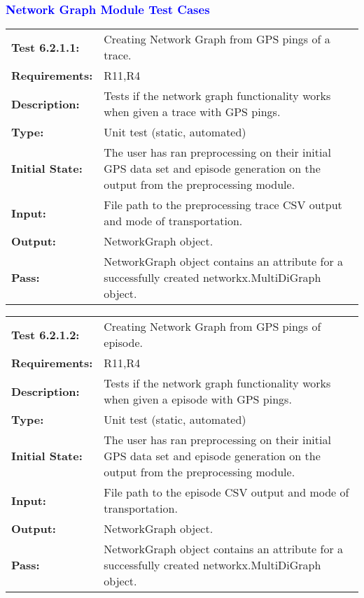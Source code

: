 \documentclass[12pt, titlepage]{article}
\begin{document}
\textcolor{blue}{
\subsubsection{Network Graph Module Test Cases}
\begin{tabular}{|l|p{10cm}|}
    \hline
    \bf{Test} 6.2.1.1: & Creating Network Graph from GPS pings of a trace. \\
    \bf{Requirements}: & R11,R4 \\
    \bf{Description}: & Tests if the network graph functionality works when given a trace with GPS pings. \\
    \bf{Type}: & Unit test (static, automated) \\
    \bf{Initial State}: & The user has ran preprocessing on their initial GPS data set and episode generation on the output from the preprocessing module. \\
    \bf{Input}: & File path to the preprocessing trace CSV output and mode of transportation. \\
    \bf{Output}: & NetworkGraph object. \\
    \bf{Pass}: & NetworkGraph object contains an attribute for a successfully created networkx.MultiDiGraph object. \\
    \hline
\end{tabular}
\begin{tabular}{|l|p{10cm}|}
    \hline
    \bf{Test} 6.2.1.2: & Creating Network Graph from GPS pings of episode. \\
    \bf{Requirements}: &  R11,R4\\
    \bf{Description}: & Tests if the network graph functionality works when given a episode with GPS pings. \\
    \bf{Type}: & Unit test (static, automated) \\
    \bf{Initial State}: & The user has ran preprocessing on their initial GPS data set and episode generation on the output from the preprocessing module. \\
    \bf{Input}: & File path to the episode CSV output and mode of transportation. \\
    \bf{Output}: & NetworkGraph object. \\
    \bf{Pass}: & NetworkGraph object contains an attribute for a successfully created networkx.MultiDiGraph object. \\
    \hline
\end{tabular}
\begin{tabular}{|l|p{10cm}|}
    \hline

\end{tabular}}
\end{document}
